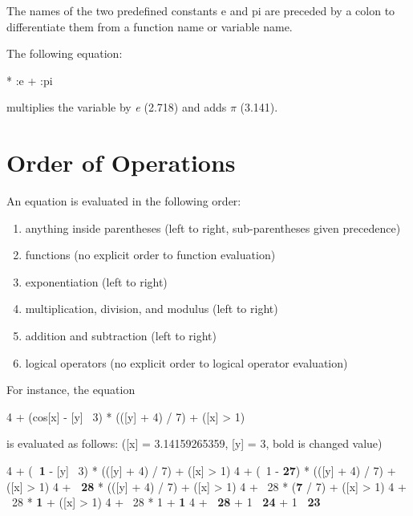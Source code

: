 The names of the two predefined constants e and pi are preceded by a
colon to differentiate them from a function name or variable name.

The following equation:

\begin{example}
[degrees] * :e + :pi 
\end{example}

multiplies the variable  by \emph{e} (2.718) and adds $\pi$
(3.141).

\section{Order of Operations}

An equation is evaluated in the following order: 

\begin{enumerate}
\item anything inside parentheses (left to right, sub-parentheses
  given precedence)
  
\item functions (no explicit order to function evaluation)
  
\item exponentiation (left to right)

\item multiplication, division, and modulus (left to right) 

\item addition and subtraction (left to right) 
  
\item logical operators (no explicit order to logical operator
  evaluation)
\end{enumerate}

For instance, the equation

\begin{example}
4 + (cos[x] - [y] \circflex\ 3) * (([y] + 4) / 7) + ([x] > 1)
\end{example}

is evaluated as follows: ([x] = 3.14159265359, [y] = 3, bold is
changed value)

\begin{example}
4 + (\textbf{~1} - [y] \circflex\ 3) * (([y] + 4) / 7) + ([x] > 1)
4 + (~1 - \textbf{27}) * (([y] + 4) / 7) + ([x] > 1)
4 + \textbf{~28} * (([y] + 4) / 7) + ([x] > 1)
4 + ~28 * (\textbf{7} / 7) + ([x] > 1)
4 + ~28 * \textbf{1} + ([x] > 1)
4 + ~28 * 1 + \textbf{1}
4 + \textbf{~28} + 1
\textbf{~24} + 1
\textbf{~23}
\end{example}

